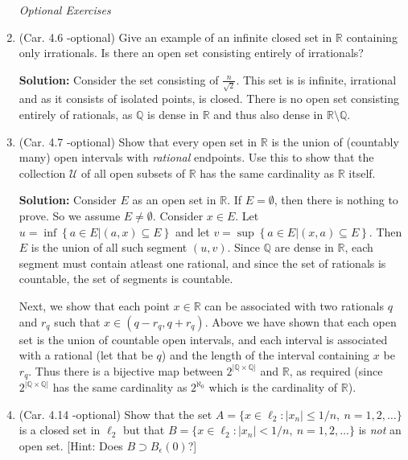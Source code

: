 \documentclass{article}
\def\le{\leqslant}
\def\QQ{\mathbb Q}
\def\RR{\mathbb R}
\begin{document}
\begin{enumerate}

\begin{center}
\hrulefill  \quad \large{\textit{Optional Exercises}} \quad \hrulefill 
\end{center}


\item (Car. 4.6 -optional) Give an example of an infinite closed set in $\RR$ containing only irrationals. Is there an open set consisting entirely of irrationals?

\textbf{Solution:} Consider the set consisting of $\frac{n}{\sqrt{2}}$. This set is is infinite, irrational and as it
consists of isolated points, is closed. There is no open set consisting entirely of rationals, as $\QQ$ is dense in
$\RR$ and thus also dense in $\RR \setminus \QQ$.


\item (Car. 4.7 -optional) Show that every open set in $\RR$ is the union of (countably many) open intervals with \textit{rational} endpoints. Use this to show that the collection $\mathscr{U}$ of all open subsets of $\RR$ has the same cardinality as $\RR$ itself.

\textbf{Solution:} Consider $E$ as an open set in $\RR$. If $E=\emptyset$, then there is nothing to prove. So we
assume $E\ne\emptyset$. Consider $x\in E$. Let $u=\inf\left\{a \in E|(a,x) \subseteq E\right\}$ and let 
$v=\sup\left\{a \in E|(x,a) \subseteq E\right\}$. Then $E$ is the union of all such segment $(u,v)$. Since
$\QQ$ are dense in $\RR$, each segment must contain atleast one rational, and since the set of rationals is
countable, the set of segments is countable.

Next, we show that each point $x\in\RR$ can be associated with two rationals $q$ and $r_q$ such that
$x\in (q-r_q,q+r_q)$. Above we have shown that each open set is the union of countable open intervals, and each
interval is associated with a rational (let that be $q$) and the length of the interval containing $x$ be
$r_q$. Thus there is a bijective map between $2^{|\QQ\times\QQ|}$ and $\RR$, as required (since $2^{|\QQ\times\QQ|}$
has the same cardinality as $2^{\aleph_0}$ which is the cardinality of $\RR$).



\item (Car. 4.14 -optional) Show that the set $A = \{ x \in \ell_2 : |x_n| \le 1/n,\ n = 1, 2, \dots \}$ is a closed set in $\ell_2$ but that $B = \{ x \in \ell_2 : |x_n| < 1/n,\ n = 1, 2, \dots \}$ is \textit{not} an open set. [Hint: Does $B \supset B_{\epsilon}(0)$?]


\end{enumerate}
\end{document}
